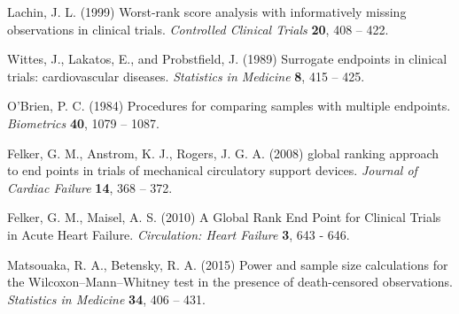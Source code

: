 \documentclass[bimj,fleqn]{w-art}\usepackage[]{graphicx}\usepackage[]{color}
\theoremstyle{plain}
\theoremstyle{definition}
\begin{document}
  \begin{thebibliography}{10}

  Lachin, J. L. (1999) Worst-rank score analysis with informatively missing observations in clinical trials.  \textit{Controlled Clinical Trials} \textbf{20}, 408 – 422.

  Wittes, J., Lakatos, E., and Probstfield, J. (1989) Surrogate endpoints in clinical trials: cardiovascular diseases. \textit{Statistics in Medicine} \textbf{8}, 415 – 425.

   O'Brien, P. C. (1984) Procedures for comparing samples with multiple endpoints. \textit{Biometrics} \textbf{40}, 1079 – 1087.

 Felker, G. M., Anstrom, K. J., Rogers, J. G. A. (2008) global ranking approach to end points in trials of mechanical circulatory support devices. \textit{Journal of Cardiac Failure} \textbf{14}, 368 – 372.

 Felker, G. M., Maisel, A. S. (2010) A Global Rank End Point for Clinical Trials in Acute Heart Failure. \textit{Circulation: Heart Failure} \textbf{3}, 643 - 646.

 Matsouaka, R. A., Betensky, R. A. (2015) Power and sample size calculations for the Wilcoxon–Mann–Whitney test in the presence of death-censored observations. \textit{Statistics in Medicine} \textbf{34}, 406 – 431.



  \end{thebibliography}
  \newpage
  \phantom{aaaa}
  
\end{document}
